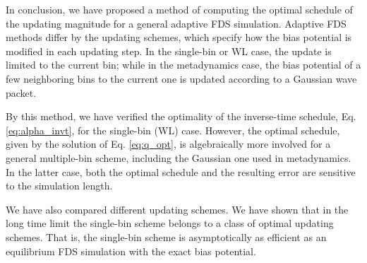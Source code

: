 \documentclass[reprint, floatfix]{revtex4-1}
\begin{document}
In conclusion,
we have proposed a method of computing
the optimal schedule of the updating magnitude
for a general adaptive FDS simulation.
%
Adaptive FDS methods differ by the updating schemes,
which specify how the bias potential is modified
in each updating step.
%
In the single-bin or WL case,
the update is limited to the current bin;
while in the metadynamics case,
the bias potential of a few neighboring bins to the current one
is updated according to a Gaussian wave packet.


By this method,
we have verified the optimality of
the inverse-time schedule,
Eq. \eqref{eq:alpha_invt},
for the single-bin (WL) case.
%
However,
the optimal schedule,
given by the solution of Eq. \eqref{eq:q_opt},
is algebraically more involved
for a general multiple-bin scheme,
including the Gaussian one used in metadynamics.
%
In the latter case,
both the optimal schedule and the resulting error
are sensitive to the simulation length.


We have also compared different updating schemes.
%
We have shown that in the long time limit
the single-bin scheme belongs to a class of
optimal updating schemes.
%
That is, the single-bin scheme
is asymptotically as efficient as
an equilibrium FDS simulation
with the exact bias potential.



%



\end{document}

